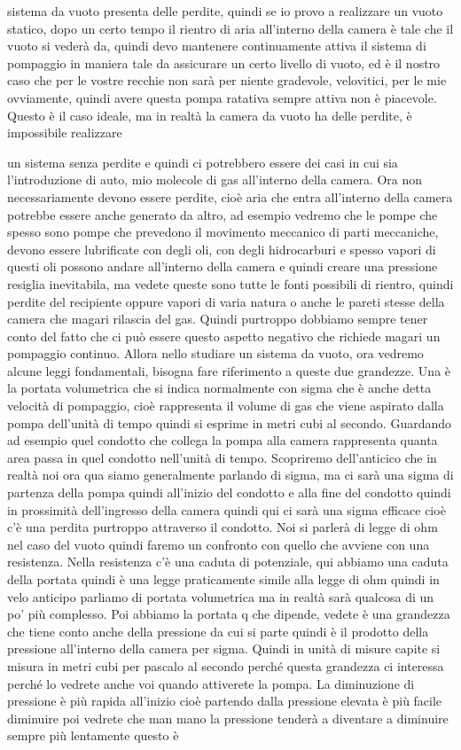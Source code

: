sistema da vuoto presenta delle perdite, quindi se io provo a realizzare un vuoto statico, dopo un certo tempo il rientro di aria all'interno della camera è tale che il vuoto si vederà da, quindi devo mantenere continuamente attiva il sistema di pompaggio in maniera tale da assicurare un certo livello di vuoto, ed è il nostro caso che per le vostre recchie non sarà per niente gradevole, velovitici, per le mie ovviamente, quindi avere questa pompa ratativa sempre attiva non è piacevole. Questo è il caso ideale, ma in realtà la camera da vuoto ha delle perdite, è impossibile realizzare

un sistema senza perdite e quindi ci potrebbero essere dei casi in cui sia l'introduzione di auto, mio molecole di gas all'interno della camera. Ora non necessariamente devono essere perdite, cioè aria che entra all'interno della camera potrebbe essere anche generato da altro, ad esempio vedremo che le pompe che spesso sono pompe che prevedono il movimento meccanico di parti meccaniche, devono essere lubrificate con degli oli, con degli hidrocarburi e spesso vapori di questi oli possono andare all'interno della camera e quindi creare una pressione resiglia inevitabila, ma vedete queste sono tutte le fonti possibili di rientro, quindi perdite del recipiente oppure vapori di varia natura o anche le pareti stesse della camera che magari rilascia del gas. Quindi purtroppo dobbiamo sempre tener conto del fatto che ci può essere questo aspetto negativo che richiede magari un pompaggio continuo. Allora nello studiare un sistema da vuoto, ora vedremo alcune leggi fondamentali, bisogna fare riferimento a queste due grandezze. Una è la portata volumetrica che si indica normalmente con sigma che è anche detta velocità di pompaggio, cioè rappresenta il volume di gas che viene aspirato dalla pompa dell'unità di tempo quindi si esprime in metri cubi al secondo. Guardando ad esempio quel condotto che collega la pompa alla camera rappresenta quanta area passa in quel condotto nell'unità di tempo. Scopriremo dell'anticico che in realtà noi ora qua siamo generalmente parlando di sigma, ma ci sarà una sigma di partenza della pompa quindi all'inizio del condotto e alla fine del condotto quindi in prossimità dell'ingresso della camera quindi qui ci sarà una sigma efficace cioè c'è una perdita purtroppo attraverso il condotto. Noi si parlerà di legge di ohm nel caso del vuoto quindi faremo un confronto con quello che avviene con una resistenza. Nella resistenza c'è una caduta di potenziale, qui abbiamo una caduta della portata quindi è una legge praticamente simile alla legge di ohm quindi in velo anticipo parliamo di portata volumetrica ma in realtà sarà qualcosa di un po' più complesso. Poi abbiamo la portata q che dipende, vedete è una grandezza che tiene conto anche della pressione da cui si parte quindi è il prodotto della pressione all'interno della camera per sigma. Quindi in unità di misure capite si misura in metri cubi per pascalo al secondo perché questa grandezza ci interessa perché lo vedrete anche voi quando attiverete la pompa. La diminuzione di pressione è più rapida all'inizio cioè partendo dalla pressione elevata è più facile diminuire poi vedrete che man mano la pressione tenderà a diventare a diminuire sempre più lentamente questo è 